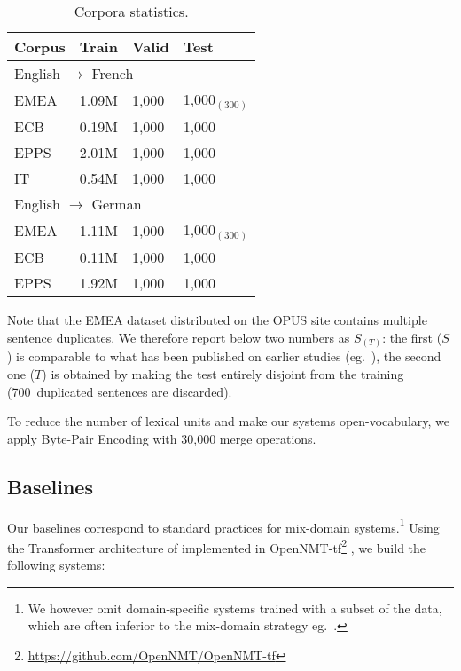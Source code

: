 \documentclass[11pt]{article}
\newcommand{\fyTodo}[1]{\Todo[FY:]{\textcolor{orange}{#1}}}
\newcommand{\fyDone}[1]{\done[FY]\Todo[FY:]{\textcolor{orange}{#1}}}
\begin{document}
\fyDone{Check which corpus are useful}
\begin{table}[h]
  \centering
  \begin{tabular}{ |llll|} %
    \hline
    Corpus & Train & Valid & Test \\ 
    \hline
    \multicolumn{4}{l}{English $\rightarrow$ French }\\
    \hline
    EMEA  & 1.09M & 1,000 & 1,000$_{(300)}$\\
    ECB    & 0.19M & 1,000 & 1,000     \\
    EPPS   & 2.01M  & 1,000 & 1,000  \\
    IT         & 0.54M  & 1,000 & 1,000 \\  
    \hline
    \multicolumn{4}{l}{English $\rightarrow$ German}\\
    \hline
    EMEA  & 1.11M & 1,000 & 1,000$_{(300)}$ \\
    ECB     &  0.11M & 1,000 & 1,000  \\
    EPPS   & 1.92M & 1,000 & 1,000 \\ 
    \hline
\end{tabular}
\caption{Corpora statistics.}
\label{tab:Corpora}
\end{table}

Note that the EMEA dataset distributed on the OPUS site contains multiple sentence duplicates. 
We therefore report below two numbers as $S_{(T)}$: the first ($S$) is comparable to what has been published on earlier studies (eg.\ \cite{Zeng18multidomain}), the second one ($T$) is obtained by making the test entirely disjoint from the training (700~duplicated sentences are discarded).

To reduce the number of lexical units and make our systems open-vocabulary, we apply Byte-Pair Encoding \cite{Sennrich16BPE} with 30,000 merge operations. \fyTodo{I need explanations here}

\subsection{Baselines \label{ssec:baselines}}

Our baselines correspond to standard practices for mix-domain systems.\footnote{We however omit domain-specific systems trained with a subset of the data, which are often inferior to the mix-domain strategy eg.\ \cite{Britz2017mixing}.} Using the Transformer architecture of  implemented in OpenNMT-tf\footnote{\url{https://github.com/OpenNMT/OpenNMT-tf}} \cite{Klein17opennmt}, we build the following systems:
\end{document}
